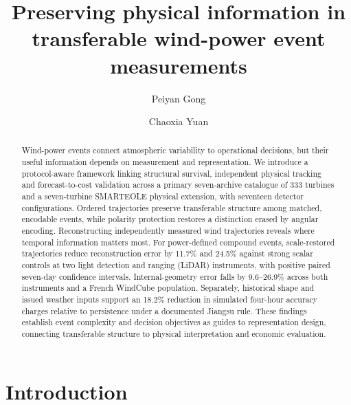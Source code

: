 \documentclass[preprint,12pt]{elsarticle}
\begin{document}
\begin{frontmatter}
\title{Preserving physical information in transferable wind-power event measurements}
\author[aff1,aff2]{Peiyan Gong}
\author[aff1,aff2]{Chaoxia Yuan}
\address[aff1]{State Key Laboratory of Climate System Prediction and Risk Management/Key Laboratory of Meteorological Disaster, Ministry of Education/Collaborative Innovation Center on Forecast and Evaluation of Meteorological Disasters, Nanjing University of Information Science and Technology, Nanjing 210044, China}
\address[aff2]{Jiangsu Key Laboratory of Intelligent Weather Forecasting and Applications Based on Big Data/School of Artificial Intelligence, Nanjing University of Information Science and Technology, Nanjing 210044, China}
\begin{abstract}
Wind-power events connect atmospheric variability to operational decisions, but their useful information depends on measurement and representation. We introduce a protocol-aware framework linking structural survival, independent physical tracking and forecast-to-cost validation across a primary seven-archive catalogue of 333 turbines and a seven-turbine SMARTEOLE physical extension, with seventeen detector configurations. Ordered trajectories preserve transferable structure among matched, encodable events, while polarity protection restores a distinction erased by angular encoding. Reconstructing independently measured wind trajectories reveals where temporal information matters most. For power-defined compound events, scale-restored trajectories reduce reconstruction error by 11.7\% and 24.5\% against strong scalar controls at two light detection and ranging (LiDAR) instruments, with positive paired seven-day confidence intervals. Internal-geometry error falls by 9.6--26.9\% across both instruments and a French WindCube population. Separately, historical shape and issued weather inputs support an 18.2\% reduction in simulated four-hour accuracy charges relative to persistence under a documented Jiangsu rule. These findings establish event complexity and decision objectives as guides to representation design, connecting transferable structure to physical interpretation and economic evaluation.

\end{abstract}
\end{frontmatter}
\FloatBarrier
\section{Introduction}\label{introduction}
\end{document}
